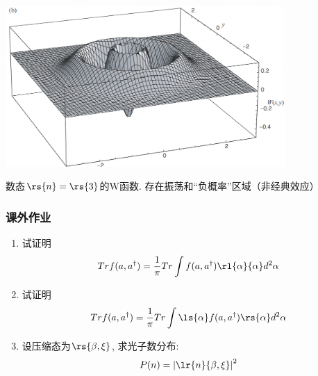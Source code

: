     \begin{frame} 
      \frametitle{}
           \begin{center}
             \includegraphics[width=0.8\textwidth]{figs/2022-06-16-12-50-28.png}
           \end{center}
           数态$\rs{n}=\rs{3}$的W函数. 存在振荡和“负概率”区域（非经典效应）
      \end{frame}
   \begin{frame} 
       \frametitle{课外作业}
       \begin{enumerate}
           \item 试证明  \[Tr f(a, a^{\dagger}) = \frac{1}{\pi}Tr \int f(a, a^{\dagger}) \rl{\alpha}{\alpha} d^2 \alpha\]
           \item 试证明  \[Tr f(a, a^{\dagger}) = \frac{1}{\pi}Tr \int \ls{\alpha} f(a, a^{\dagger}) \rs{\alpha} d^2 \alpha\]
           \item 设压缩态为$\rs{\beta,\xi}$, 求光子数分布:
           \[ P(n) = \left| \lr{n}{\beta,\xi} \right|^2\]
       \end{enumerate}
   \end{frame}

